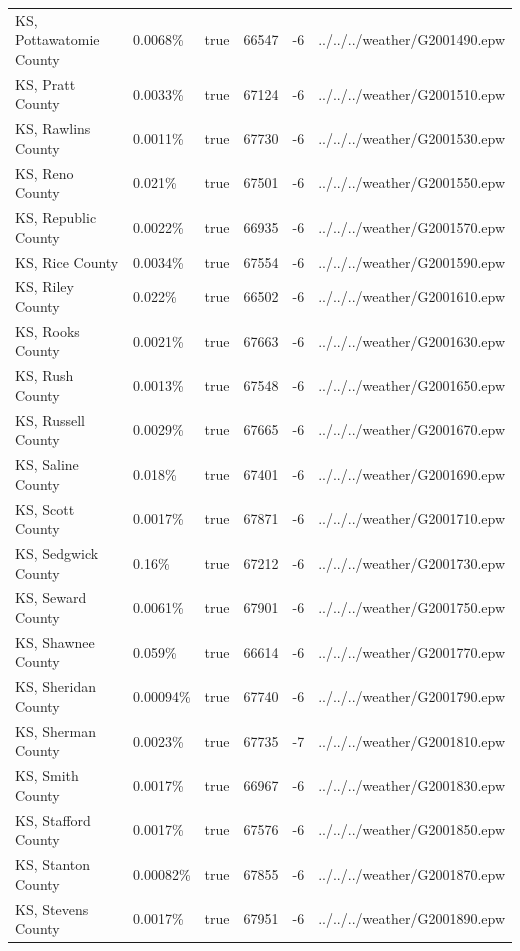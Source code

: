 \begin{longtable}[]{@{}llllll@{}}
KS, Pottawatomie County & 0.0068\% & true & 66547 & -6 &
../../../weather/G2001490.epw \\
KS, Pratt County & 0.0033\% & true & 67124 & -6 &
../../../weather/G2001510.epw \\
KS, Rawlins County & 0.0011\% & true & 67730 & -6 &
../../../weather/G2001530.epw \\
KS, Reno County & 0.021\% & true & 67501 & -6 &
../../../weather/G2001550.epw \\
KS, Republic County & 0.0022\% & true & 66935 & -6 &
../../../weather/G2001570.epw \\
KS, Rice County & 0.0034\% & true & 67554 & -6 &
../../../weather/G2001590.epw \\
KS, Riley County & 0.022\% & true & 66502 & -6 &
../../../weather/G2001610.epw \\
KS, Rooks County & 0.0021\% & true & 67663 & -6 &
../../../weather/G2001630.epw \\
KS, Rush County & 0.0013\% & true & 67548 & -6 &
../../../weather/G2001650.epw \\
KS, Russell County & 0.0029\% & true & 67665 & -6 &
../../../weather/G2001670.epw \\
KS, Saline County & 0.018\% & true & 67401 & -6 &
../../../weather/G2001690.epw \\
KS, Scott County & 0.0017\% & true & 67871 & -6 &
../../../weather/G2001710.epw \\
KS, Sedgwick County & 0.16\% & true & 67212 & -6 &
../../../weather/G2001730.epw \\
KS, Seward County & 0.0061\% & true & 67901 & -6 &
../../../weather/G2001750.epw \\
KS, Shawnee County & 0.059\% & true & 66614 & -6 &
../../../weather/G2001770.epw \\
KS, Sheridan County & 0.00094\% & true & 67740 & -6 &
../../../weather/G2001790.epw \\
KS, Sherman County & 0.0023\% & true & 67735 & -7 &
../../../weather/G2001810.epw \\
KS, Smith County & 0.0017\% & true & 66967 & -6 &
../../../weather/G2001830.epw \\
KS, Stafford County & 0.0017\% & true & 67576 & -6 &
../../../weather/G2001850.epw \\
KS, Stanton County & 0.00082\% & true & 67855 & -6 &
../../../weather/G2001870.epw \\
KS, Stevens County & 0.0017\% & true & 67951 & -6 &
../../../weather/G2001890.epw \\

\end{longtable}
